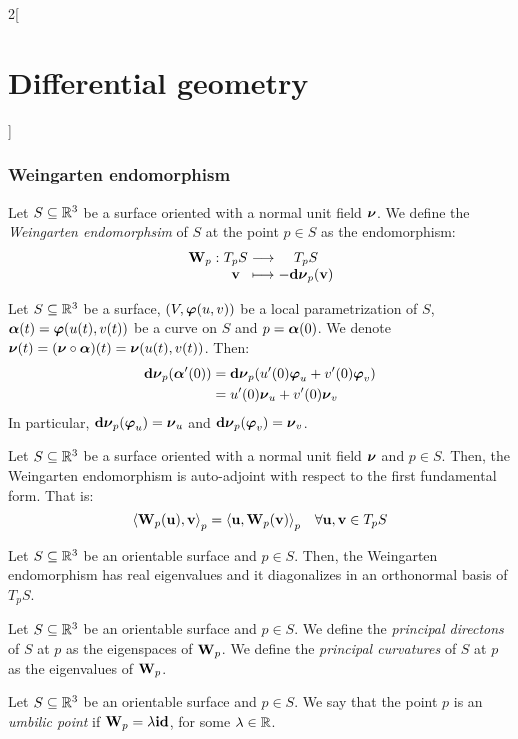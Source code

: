 \documentclass[../../../main.tex]{subfiles}
\begin{document}
\begin{multicols}{2}[\section{Differential geometry}]
  \subsubsection{Weingarten endomorphism}
  \begin{definition}
    Let $S\subseteq\mathbb{R}^3$ be a surface oriented with a normal unit field $\boldsymbol{\mathrm{\nu}}$. We define the \emph{Weingarten endomorphsim} of $S$ at the point $p\in S$ as the endomorphism: $$\function{\vf{W}_p}{T_pS}{T_pS}{\vf{v}}{-\vf{\dd{\nu}}_p(\vf{v})}$$
  \end{definition}
  \begin{lemma}
    Let $S\subseteq\mathbb{R}^3$ be a surface, $(V,\boldsymbol{\mathrm{\varphi}}(u,v))$ be a local parametrization of $S$, $\boldsymbol{\mathrm{\alpha}}(t)=\boldsymbol{\mathrm{\varphi}}(u(t),v(t))$ be a curve on $S$ and $p=\boldsymbol{\mathrm{\alpha}}(0)$. We denote $\boldsymbol{\mathrm{\nu}}(t)=(\boldsymbol{\mathrm{\nu}}\circ\boldsymbol{\mathrm{\alpha}})(t)=\boldsymbol{\mathrm{\nu}}(u(t),v(t))$. Then:
    \begin{align*}
      \boldsymbol{\mathrm{\dd{\nu}}}_p(\boldsymbol{\mathrm{\alpha}}'(0)) & =\boldsymbol{\mathrm{\dd{\nu}}}_p(u'(0)\boldsymbol{\mathrm{\varphi}}_u+v'(0)\boldsymbol{\mathrm{\varphi}}_v) \\
                                     & =u'(0)\boldsymbol{\mathrm{\nu}}_u+v'(0)\boldsymbol{\mathrm{\nu}}_v
    \end{align*}
    In particular, $\boldsymbol{\mathrm{\dd{\nu}}}_p(\boldsymbol{\mathrm{\varphi}}_u)=\boldsymbol{\mathrm{\nu}}_u$ and $\boldsymbol{\mathrm{\dd{\nu}}}_p(\boldsymbol{\mathrm{\varphi}}_v)=\boldsymbol{\mathrm{\nu}}_v$.
  \end{lemma}
  \begin{proposition}
    Let $S\subseteq\mathbb{R}^3$ be a surface oriented with a normal unit field $\boldsymbol{\mathrm{\nu}}$ and $p\in S$. Then, the Weingarten endomorphism is auto-adjoint with respect to the first fundamental form. That is: $${\langle \boldsymbol{\mathrm{W}}_p(\boldsymbol{\mathrm{u}}),\boldsymbol{\mathrm{v}}\rangle}_p={\langle \boldsymbol{\mathrm{u}},\boldsymbol{\mathrm{W}}_p(\boldsymbol{\mathrm{v}})\rangle}_p\quad\forall\boldsymbol{\mathrm{u}},\boldsymbol{\mathrm{v}}\in T_pS$$
  \end{proposition}
  \begin{proposition}
    Let $S\subseteq\mathbb{R}^3$ be an orientable surface and $p\in S$. Then, the Weingarten endomorphism has real eigenvalues and it diagonalizes in an orthonormal basis of $T_pS$.
  \end{proposition}
  \begin{definition}
    Let $S\subseteq\mathbb{R}^3$ be an orientable surface and $p\in S$. We define the \emph{principal directons} of $S$ at $p$ as the eigenspaces of $\boldsymbol{\mathrm{W}}_p$. We define the \emph{principal curvatures} of $S$ at $p$ as the eigenvalues of $\boldsymbol{\mathrm{W}}_p$.
  \end{definition}
  \begin{definition}
    Let $S\subseteq\mathbb{R}^3$ be an orientable surface and $p\in S$. We say that the point $p$ is an \emph{umbilic point} if $\boldsymbol{\mathrm{W}}_p=\lambda \boldsymbol{\mathrm{id}}$, for some $\lambda\in\mathbb{R}$.

\end{definition}
\end{multicols}
\end{document}
